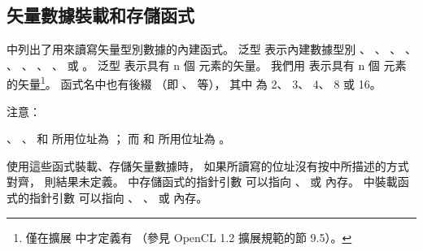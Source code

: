 \subsection{矢量數據裝載和存儲函式}

中列出了用來讀寫矢量型別數據的內建函式。
泛型  表示內建數據型別
 、 、 、 、
 、 、 、 、
  或 。
泛型  表示具有 n 個  元素的矢量。
我們用  表示具有 n 個  元素的矢量\footnote{
僅在擴展  中才定義有 
（參見 OpenCL 1.2 擴展規範的節 9.5）。}。
函式名中也有後綴  （即 、  等），
其中  為 2、 3、 4、 8 或 16。

{}

注意：

、 、  和 
 所用位址為 ；
而  和 
 所用位址為 。

使用這些函式裝載、存儲矢量數據時，
如果所讀寫的位址沒有按中所描述的方式對齊，
則結果未定義。
中存儲函式的指針引數  可以指向
 、  或  內存。
中裝載函式的指針引數  可以指向
 、 、  或  內存。

